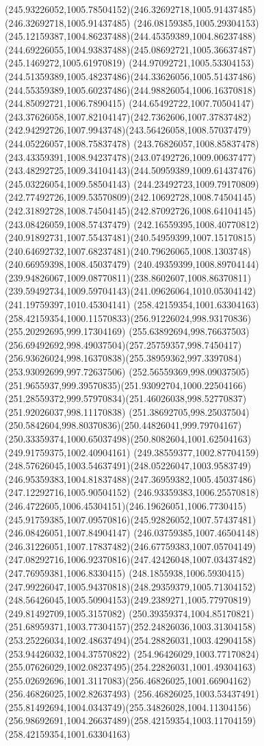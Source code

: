 {{	\curveto(245.93226052,1005.78504152)(246.32692718,1005.91437485)(246.32692718,1005.91437485)
	\curveto(246.08159385,1005.29304153)(245.12159387,1004.86237488)(244.45359389,1004.86237488)
	\curveto(244.69226055,1004.93837488)(245.08692721,1005.36637487)(245.1469272,1005.61970819)
	\curveto(244.97092721,1005.53304153)(244.51359389,1005.48237486)(244.33626056,1005.51437486)
	\curveto(244.55359389,1005.60237486)(244.98826054,1006.16370818)(244.85092721,1006.7890415)
	\curveto(244.65492722,1007.70504147)(243.37626058,1007.82104147)(242.7362606,1007.37837482)
	\curveto(242.94292726,1007.9943748)(243.56426058,1008.57037479)(244.05226057,1008.75837478)
	\curveto(243.76826057,1008.85837478)(243.43359391,1008.94237478)(243.07492726,1009.00637477)
	\curveto(243.48292725,1009.34104143)(244.50959389,1009.61437476)(245.03226054,1009.58504143)
	\curveto(244.23492723,1009.79170809)(242.77492726,1009.53570809)(242.10692728,1008.74504145)
	\curveto(242.31892728,1008.74504145)(242.87092726,1008.64104145)(243.08426059,1008.57437479)
	\curveto(242.16559395,1008.40770812)(240.91892731,1007.55437481)(240.54959399,1007.15170815)
	\curveto(240.64692732,1007.68237481)(240.79626065,1008.1303748)(240.66959398,1008.45037479)
	\curveto(240.49359399,1008.89704144)(239.94826067,1009.08770811)(238.8602607,1008.86370811)
	\curveto(239.59492734,1009.59704143)(241.09626064,1010.05304142)(241.19759397,1010.45304141)
	\moveto(258.42159354,1001.63304163)
	\curveto(258.42159354,1000.11570833)(256.91226024,998.93170836)(255.20292695,999.17304169)
	\curveto(255.63892694,998.76637503)(256.69492692,998.49037504)(257.25759357,998.7450417)
	\curveto(256.93626024,998.16370838)(255.38959362,997.3397084)(253.93092699,997.72637506)
	\curveto(252.56559369,998.09037505)(251.9655937,999.39570835)(251.93092704,1000.22504166)
	\curveto(251.28559372,999.57970834)(251.46026038,998.52770837)(251.92026037,998.11170838)
	\curveto(251.38692705,998.25037504)(250.5842604,998.80370836)(250.44826041,999.79704167)
	\curveto(250.33359374,1000.65037498)(250.8082604,1001.62504163)(249.91759375,1002.40904161)
	\curveto(249.38559377,1002.87704159)(248.57626045,1003.54637491)(248.05226047,1003.9583749)
	\curveto(246.95359383,1004.81837488)(247.36959382,1005.45037486)(247.12292716,1005.90504152)
	\curveto(246.93359383,1006.25570818)(246.4722605,1006.45304151)(246.19626051,1006.7730415)
	\curveto(245.91759385,1007.09570816)(245.92826052,1007.57437481)(246.08426051,1007.84904147)
	\curveto(246.03759385,1007.46504148)(246.31226051,1007.17837482)(246.67759383,1007.05704149)
	\curveto(247.08292716,1006.92370816)(247.42426048,1007.03437482)(247.76959381,1006.8330415)
	\curveto(248.1855938,1006.5930415)(247.99226047,1005.94370818)(248.29359379,1005.71304152)
	\curveto(248.56426045,1005.50904153)(249.2389271,1005.77970819)(249.81492709,1005.3157082)
	\curveto(250.39359374,1004.85170821)(251.68959371,1003.77304157)(252.24826036,1003.31304158)
	\curveto(253.25226034,1002.48637494)(254.28826031,1003.42904158)(253.94426032,1004.37570822)
	\curveto(254.96426029,1003.77170824)(255.07626029,1002.08237495)(254.22826031,1001.49304163)
	\curveto(255.02692696,1001.3117083)(256.46826025,1001.66904162)(256.46826025,1002.82637493)
	\curveto(256.46826025,1003.53437491)(255.81492694,1004.0343749)(255.34826028,1004.11304156)
	\curveto(256.98692691,1004.26637489)(258.42159354,1003.11704159)(258.42159354,1001.63304163)
}
}
